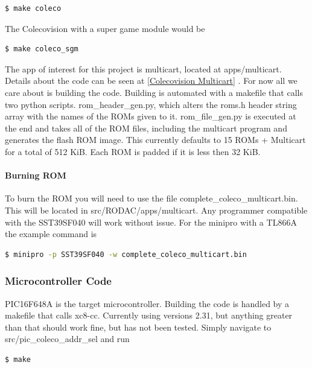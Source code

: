 \documentclass{article}
\begin{document}
  \begin{lstlisting}[language=bash]
    $ make coleco
  \end{lstlisting}

  The Colecovision with a super game module would be

  \begin{lstlisting}[language=bash]
    $ make coleco_sgm
  \end{lstlisting}

  \par
  The app of interest for this project is multicart, located at apps/multicart. Details about the code can be seen at \ref{Colecovision Multicart} . For now all we care about is building
  the code. Building is automated with a makefile that calls two python scripts. rom\_header\_gen.py, which alters the roms.h header string array with the names of the ROMs
  given to it. rom\_file\_gen.py is executed at the end and takes all of the ROM files, including the multicart program and generates the flash ROM image. This currently
  defaults to 15 ROMs + Multicart for a total of 512 KiB. Each ROM is padded if it is less then 32 KiB.

  \paragraph{Burning ROM}
  To burn the ROM you will need to use the file complete\_coleco\_multicart.bin. This will be located in src/RODAC/apps/multicart. Any programmer compatible with the
  SST39SF040 will work without issue. For the minipro with a TL866A the example command is

  \begin{lstlisting}[language=bash]
$ minipro -p SST39SF040 -w complete_coleco_multicart.bin
  \end{lstlisting}

  \subsubsection{Microcontroller Code}

  \par
  PIC16F648A is the target microcontroller. Building the code is handled by a makefile that calls xc8-cc. Currently using versions 2.31, but anything greater than that should work
  fine, but has not been tested. Simply navigate to src/pic\_coleco\_addr\_sel and run

  \begin{lstlisting}[language=bash]
    $ make
  \end{lstlisting}
\end{document}
